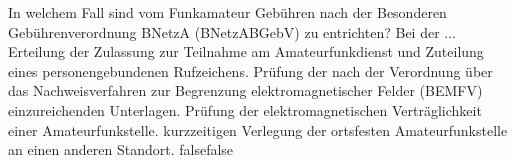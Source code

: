     {In welchem Fall sind vom Funkamateur Gebühren nach der Besonderen Gebührenverordnung BNetzA (BNetzABGebV) zu entrichten? Bei der ...}
    {Erteilung der Zulassung zur Teilnahme am Amateurfunkdienst und Zuteilung eines personengebundenen Rufzeichens.}
    {Prüfung der nach der Verordnung über das Nachweisverfahren zur Begrenzung elektromagnetischer Felder (BEMFV) einzureichenden Unterlagen.}
    {Prüfung der elektromagnetischen Verträglichkeit einer Amateurfunkstelle.}
    {kurzzeitigen Verlegung der ortsfesten Amateurfunkstelle an einen anderen Standort.}
    {false}{false}